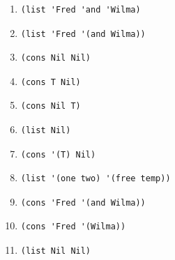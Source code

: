 \documentclass[a4paper,oneside,14pt]{extarticle}
\begin{document}
\begin{enumerate}
    \item \begin{lstlisting}[label={lst:}]
(list 'Fred 'and 'Wilma)
        \end{lstlisting}

    \item \begin{lstlisting}[label={lst:}]
(list 'Fred '(and Wilma))
        \end{lstlisting}

    \item \begin{lstlisting}[label={lst:}]
(cons Nil Nil)
        \end{lstlisting}

    \item \begin{lstlisting}[label={lst:}]
(cons T Nil)
        \end{lstlisting}

    \item \begin{lstlisting}[label={lst:}]
(cons Nil T)
        \end{lstlisting}

    \item \begin{lstlisting}[label={lst:}]
(list Nil)
        \end{lstlisting}

    \item \begin{lstlisting}[label={lst:}]
(cons '(T) Nil)
        \end{lstlisting}

    \item \begin{lstlisting}[label={lst:}]
(list '(one two) '(free temp))
        \end{lstlisting}

    \item \begin{lstlisting}[label={lst:}]
(cons 'Fred '(and Wilma))
        \end{lstlisting}

    \item \begin{lstlisting}[label={lst:}]
(cons 'Fred '(Wilma))
        \end{lstlisting}

    \item \begin{lstlisting}[label={lst:}]
(list Nil Nil)
        \end{lstlisting}


\end{enumerate}
\end{document}
